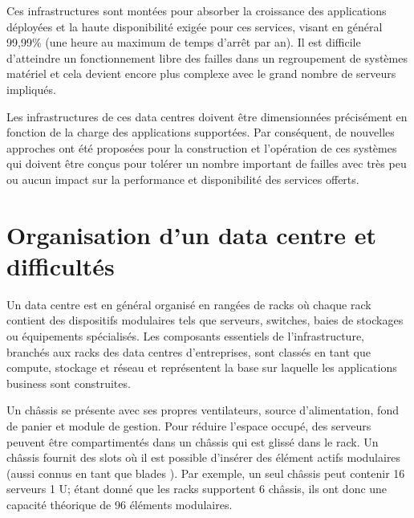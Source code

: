 Ces infrastructures sont montées pour absorber la croissance des applications déployées et la haute disponibilité exigée pour ces services, visant en général 99,99\% (une heure au maximum de temps d'arrêt par an). Il est difficile d'atteindre un fonctionnement libre des failles dans un regroupement de systèmes matériel et cela devient encore plus complexe avec le grand nombre de serveurs impliqués.

\par
Les infrastructures de ces data centres doivent être dimensionnées précisément  en fonction de la charge des applications supportées. Par conséquent, de nouvelles approches ont été proposées pour la construction et l'opération de ces systèmes qui doivent être conçus pour tolérer un nombre important de failles avec très peu ou aucun impact sur la performance et disponibilité des services offerts. \cite{understandingCloudWhatDC}  \cite{datacenterAsComputerIntro}

\section{Organisation d'un data centre et difficultés}

Un data centre est en général organisé en rangées de racks où chaque rack contient des dispositifs modulaires tels que serveurs, switches, baies de stockages ou équipements spécialisés. %
Les composants essentiels de l'infrastructure, branchés aux racks des data centres d'entreprises, sont classés en tant que compute, stockage et réseau et représentent la base sur laquelle les applications business sont construites. 

Un châssis se présente avec ses propres ventilateurs, source d'alimentation, fond de panier et module de gestion. 
Pour réduire l'espace occupé, des serveurs peuvent être compartimentés dans un châssis qui est glissé dans le rack. Un châssis fournit des slots %
où il est possible d'insérer des élément actifs modulaires (aussi connus en tant que \og blades \fg{}). Par exemple, un seul châssis peut contenir 16 serveurs 1 U; étant donné que les racks supportent 6 châssis, ils ont donc une capacité théorique de 96 éléments modulaires.


